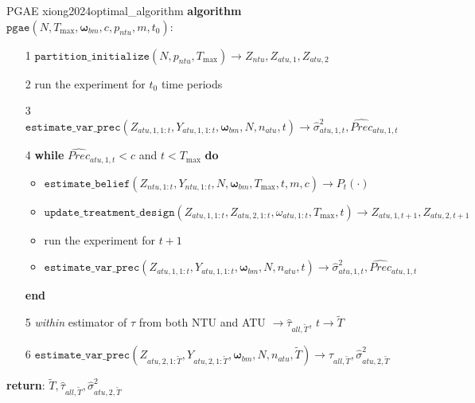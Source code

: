\documentclass[twoside]{article}
\begin{document}
\begin{algorithm}{PGAE \citep{xiong2024optimal}}{xiong2024optimal_algorithm}
    \textbf{algorithm} $\mathtt{pgae}(N,T_{\max},\boldsymbol{\omega}_{bm},c,p_{ntu},m,t_0)$:
    \begin{itemize}
        \item[1] $\mathtt{partition\_initialize}(N,p_{ntu},T_{\max}) \rightarrow Z_{ntu},Z_{atu,1},Z_{atu,2}$
        \item[2] run the experiment for $t_0$ time periods 
        \item[3] $\mathtt{estimate\_var\_prec}(Z_{atu,1,1:t},Y_{atu,1,1:t},\boldsymbol{\omega}_{bm},N,n_{atu},t) \rightarrow \hat{\sigma}^2_{atu,1,t},\widehat{Prec}_{atu,1,t}$
        \item[4] \textbf{while} $\widehat{Prec}_{atu,1,t} < c$ and $t<T_{\max}$ \textbf{do}
        \begin{itemize}
            \item $\mathtt{estimate\_belief}\left(Z_{ntu,1:t},Y_{ntu,1:t},N,\boldsymbol{\omega}_{bm},T_{\max},t,m,c\right) \rightarrow P_t(\cdot)$
            \item $\mathtt{update\_treatment\_design}\left(Z_{atu,1,1:t},Z_{atu,2,1:t},\omega_{atu,1:t},T_{\max},t\right)\rightarrow Z_{atu,1,t+1},Z_{atu,2,t+1}$
            \item run the experiment for $t+1$
            \item $\mathtt{estimate\_var\_prec}\left(Z_{atu,1,1:t},Y_{atu,1,1:t},\boldsymbol{\omega}_{bm},N,n_{atu},t\right) \rightarrow \hat{\sigma}^2_{atu,1,t},\widehat{Prec}_{atu,1,t}$
        \end{itemize}
        \textbf{end}
        \item[5] \textit{within} estimator of $\tau$ from both NTU and ATU $\rightarrow \hat{\tau}_{all,\tilde{T}}$, $t\rightarrow \tilde{T}$
        \item[6] $\mathtt{estimate\_var\_prec}\left(Z_{atu,2,1:\tilde{T}},Y_{atu,2,1:\tilde{T}},\boldsymbol{\omega}_{bm},N,n_{atu},\tilde{T}\right) \rightarrow \hat{\tau}_{all,\tilde{T}},\hat{\sigma}^2_{atu,2,\tilde{T}}$
    \end{itemize}
    \textbf{return}: $\tilde{T},\hat{\tau}_{all,\tilde{T}},\hat{\sigma}^2_{atu,2,\tilde{T}}$
\end{algorithm}
\end{document}
